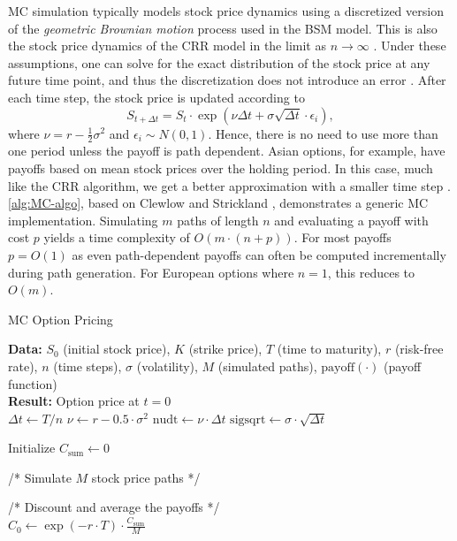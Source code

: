 \documentclass[english,12pt,a4paper,pdftex,sci,utf8]{aaltothesis}
\begin{document}
MC simulation typically models stock price dynamics using a discretized version of the \emph{geometric Brownian motion} process used in the BSM model. This is also the stock price dynamics of the CRR model in the limit as $n \rightarrow \infty$ \cite{cox1979option}. Under these assumptions, one can solve for the exact distribution of the stock price at any future time point, and thus the discretization does not introduce an error \cite{clewlow1998implementing}. After each time step, the stock price is updated according to
\begin{equation*}
S_{t+\Delta t} = S_t \cdot \exp \left( \nu \Delta t + \sigma \sqrt{\Delta t} \cdot \epsilon_i \right),
\label{eq:GBM-price}
\end{equation*}
where $\nu=r-\frac{1}{2}\sigma^2$ and $\epsilon_i \sim N(0,1)$. Hence, there is no need to use more than one period unless the payoff is path dependent. Asian options, for example, have payoffs based on mean stock prices over the holding period. In this case, much like the CRR algorithm, we get a better approximation with a smaller time step \cite{clewlow1998implementing}. \cref{alg:MC-algo}, based on Clewlow and Strickland \cite{clewlow1998implementing}, demonstrates a generic MC implementation. Simulating $m$ paths of length $n$ and evaluating a payoff with cost $p$ yields a time complexity of $O(m \cdot (n+p))$. For most payoffs $p=O(1)$ as even path-dependent payoffs can often be computed incrementally during path generation. For European options where $n=1$, this reduces to $O(m)$.

\begin{algorithm}
\caption{MC Option Pricing}
\label{alg:MC-algo}
\textbf{Data:} $S_0$ (initial stock price), $K$ (strike price), $T$ (time to maturity), $r$ (risk-free rate), $n$ (time steps), $\sigma$ (volatility), $M$ (simulated paths), $\text{payoff}(\cdot)$ (payoff function)\\
\textbf{Result:} Option price at $t=0$\\

$\Delta t \gets T/n$\;
$\nu \gets r - 0.5 \cdot \sigma^2$\;
$\text{nudt} \gets \nu \cdot \Delta t$\;
$\text{sigsqrt} \gets \sigma \cdot \sqrt{\Delta t}$\;

Initialize $C_{\text{sum}} \gets 0$\;

/* Simulate $M$ stock price paths */\\

/* Discount and average the payoffs */\\
$C_0 \gets \exp(-r \cdot T) \cdot \frac{C_{\text{sum}}}{M}$\;

\;
\end{algorithm}
\end{document}
